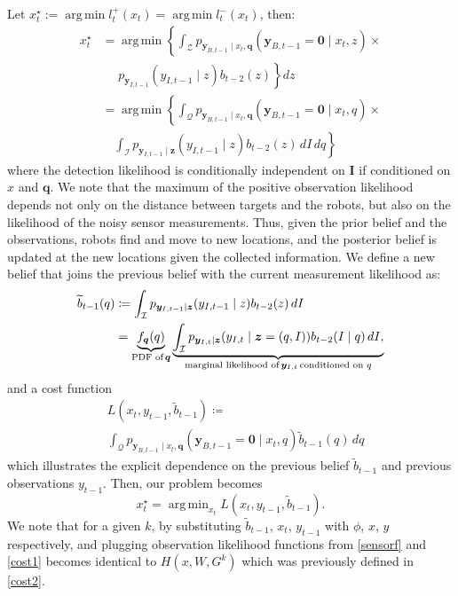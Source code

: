 \documentclass[letterpaper, 10 pt, conference]{ieeeconf}
\DeclareMathOperator*{\argmin}{arg\,min}
\begin{document}
Let ${x}^{\star}_t := \argmin l_t^+(x_t) = \argmin l_t^-(x_t)$, then:
\begin{align}
{x}_t^{\star} &= \argmin \left\{
\int_\mathcal{Z} 
p_{\bm{y}_{B,t-1}\mid x_t,\bm{q}}(\bm{y}_{B,t-1}=\mathbf{0} \mid x_t,z) \times \right. \nonumber\\
&\,\,\,\,\,\,\,\,\left.p_{\bm{y}_{I,t-1}}(y_{I,t-1} \mid z)b_{t-2}(z) \right\}
dz \\
&= \argmin \left\{ \int_{\mathcal{Q}}
p_{\bm{y}_{B,t-1}\mid x_t,\bm{q}}(\bm{y}_{B,t-1}=\mathbf{0} \mid x_t,q) \times \right. \nonumber \\
&\,\,\,\,\,\,\left.\int_{\mathcal{I}} 
p_{\bm{y}_{I,t-1}\mid \bm{z}}(y_{I,t-1} \mid z)b_{t-2}(z)
\,dI\,dq \right\}
\end{align}
where the detection likelihood is conditionally independent on $\bm{I}$ if conditioned on $x$ and $\bm{q}$.
We note that the maximum of the positive observation likelihood depends not only on the distance between targets and the robots, but also on the likelihood of the noisy sensor measurements.
Thus, given the prior belief and the observations, robots find and move to new locations, and the posterior belief is updated at the new locations given the collected information.
We define a new belief that joins the previous belief with the current measurement likelihood as:
\begin{align}
\widetilde{b}_{t-1}(q)
&\coloneqq \int_{\mathcal{I}} 
p_{\bm{y}_{I,t-1}\mid \bm{z}}(y_{I,t-1} \mid z)b_{t-2}(z)\,
dI  \nonumber \\
&=
\underbrace{f_{\bm{q}}(q)}_{\textup{PDF of}\,\bm{q}}\underbrace{\int_{\mathcal{I}} p_{\bm{y}_{I,t} \mid \bm{z}}(y_{I,t}\mid \bm{z} = (q,I))b_{t-2}(I \mid q)\,dI,}_{\textup{marginal likelihood of}\,\bm{y}_{I,t}\,\textup{conditioned on }q}
\end{align} 
and a cost function 
\begin{align}
&L(x_t,y_{t-1},\widetilde{b}_{t-1})\coloneqq \nonumber \\
&\int_{\mathcal{Q}}
p_{\bm{y}_{B,t-1} \mid
	{x}_{t},\bm{q}}\left(
\bm{y}_{B,t-1} = \bm{0} \mid
{x}_{t},q\right)
\widetilde{b}_{t-1}(q)
\,dq
\label{cost1}
\end{align}
which illustrates the explicit dependence on the previous belief $\tilde{b}_{t-1}$ and previous observations $y_{t-1}$. 
Then, our problem becomes 
\begin{equation}
{x}_t^{\star} = \argmin_{x_t} L(x_t,y_{t-1},\widetilde{b}_{t-1}).
\label{mmle}
\end{equation}
We note that for a given $k$, by substituting $\widetilde{b}_{t-1}$, $x_t$, $y_{t-1}$ with $\phi$, $x$, $y$ respectively, and plugging observation likelihood functions from \eqref{sensorf} and \eqref{cost1} becomes identical to $H(x,W,G^k)$ which was previously defined in \eqref{cost2}.
\end{document}
